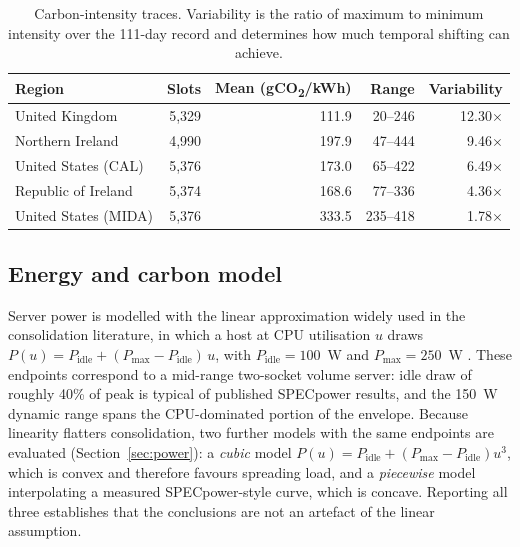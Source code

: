 \documentclass[12pt,a4paper]{article}
\begin{document}
\begin{table}[H]\centering\small
\caption{Carbon-intensity traces. Variability is the ratio of maximum to minimum intensity over the
111-day record and determines how much temporal shifting can achieve.}\label{tab:regions}
\begin{tabular}{lrrrr}
\toprule
Region & Slots & Mean (gCO\textsubscript{2}/kWh) & Range & Variability \\
\midrule
United Kingdom       & 5{,}329 & 111.9 & 20--246  & 12.30$\times$ \\
Northern Ireland     & 4{,}990 & 197.9 & 47--444  & 9.46$\times$ \\
United States (CAL)  & 5{,}376 & 173.0 & 65--422  & 6.49$\times$ \\
Republic of Ireland  & 5{,}374 & 168.6 & 77--336  & 4.36$\times$ \\
United States (MIDA) & 5{,}376 & 333.5 & 235--418 & 1.78$\times$ \\
\bottomrule
\end{tabular}
\end{table}

\subsection{Energy and carbon model}
Server power is modelled with the linear approximation widely used in the consolidation literature, in which
a host at CPU utilisation $u$ draws $P(u)=P_{\text{idle}}+(P_{\text{max}}-P_{\text{idle}})\,u$, with
$P_{\text{idle}}=100$~W and $P_{\text{max}}=250$~W \cite{beloglazov2012energy}. These endpoints correspond to
a mid-range two-socket volume server: idle draw of roughly 40\% of peak is typical of published SPECpower
results, and the 150~W dynamic range spans the CPU-dominated portion of the envelope. Because linearity
flatters consolidation, two further models with the same endpoints are evaluated
(Section~\ref{sec:power}): a \emph{cubic} model $P(u)=P_{\text{idle}}+(P_{\text{max}}-P_{\text{idle}})u^{3}$,
which is convex and therefore favours spreading load, and a \emph{piecewise} model interpolating a measured
SPECpower-style curve, which is concave. Reporting all three establishes that the conclusions are not an
artefact of the linear assumption.
\end{document}
